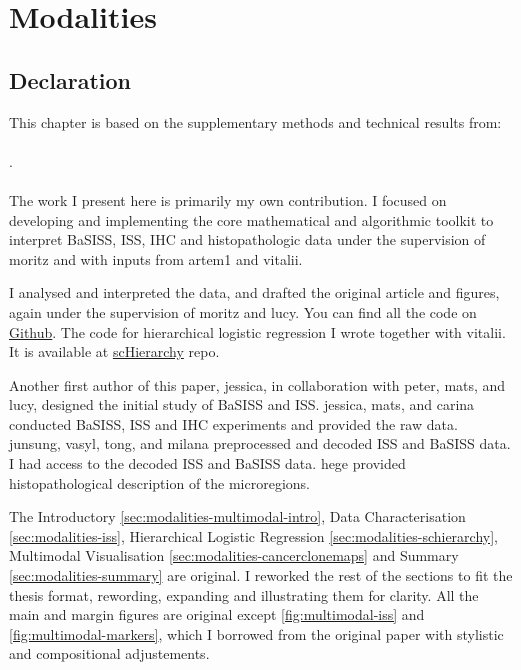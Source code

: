\chapter{Modalities}
\label{sec:chapter-basiss-multimodal}

\section*{Declaration}

This chapter is based on the supplementary methods and technical results from:
\\~\\
 . 
\\~\\
The work I present here is primarily my own contribution. I focused on developing and implementing the core mathematical and algorithmic toolkit to interpret \acs{BaSISS}, \acs{ISS}, \acs{IHC} and histopathologic data under the supervision of \ac{moritz} and with inputs from \ac{artem1} and \ac{vitalii}. 

I analysed and interpreted the data, and drafted the original article and figures, again under the supervision of \ac{moritz} and \ac{lucy}. You can find all the code on \href{https://github.com/gerstung-lab/BaSISS}{Github}. The code for hierarchical logistic regression I wrote together with \ac{vitalii}. It is available at \href{https://github.com/dissatisfaction-ai/scHierarchy}{scHierarchy} repo.

Another first author of this paper, \ac{jessica}, in collaboration with \ac{peter}, \ac{mats}, and \ac{lucy}, designed the initial study of \acs{BaSISS} and \acs{ISS}. \ac{jessica}, \ac{mats}, and \ac{carina} conducted \acs{BaSISS}, \acs{ISS} and \acs{IHC} experiments and provided the raw data. \ac{junsung}, \ac{vasyl}, \ac{tong}, and \ac{milana} preprocessed and decoded \acs{ISS} and \acs{BaSISS} data. I had access to the decoded \acs{ISS} and \acs{BaSISS} data. \ac{hege} provided histopathological description of the microregions.

The Introductory \cref{sec:modalities-multimodal-intro}, Data Characterisation \cref{sec:modalities-iss}, Hierarchical Logistic Regression \cref{sec:modalities-schierarchy}, Multimodal Visualisation \cref{sec:modalities-cancerclonemaps} and Summary \cref{sec:modalities-summary} are original. I reworked the rest of the sections to fit the thesis format, rewording, expanding and illustrating them for clarity. All the main and margin figures are original except \cref{fig:multimodal-iss} and \cref{fig:multimodal-markers}, which I borrowed from the original paper with stylistic and compositional adjustements. 

